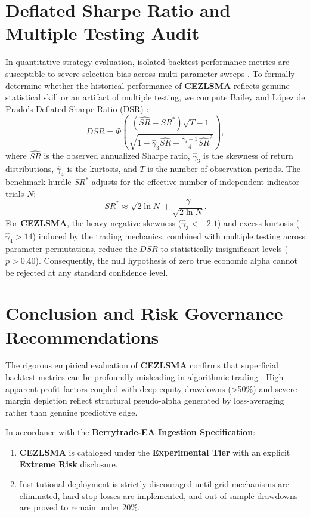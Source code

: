 \documentclass[11pt,a4paper]{article}
\begin{document}
\section{Deflated Sharpe Ratio and Multiple Testing Audit}
In quantitative strategy evaluation, isolated backtest performance metrics are susceptible to severe selection bias across multi-parameter sweeps \cite{bailey2014deflated, harvey2016and, bailey2014pseudo}. To formally determine whether the historical performance of \textbf{CEZLSMA} reflects genuine statistical skill or an artifact of multiple testing, we compute Bailey and L{\'o}pez de Prado's Deflated Sharpe Ratio (DSR) \cite{bailey2014deflated}:
\begin{equation}
DSR = \Phi\left( \frac{(\widehat{SR} - SR^*) \sqrt{T-1}}{\sqrt{1 - \hat{\gamma}_3 \widehat{SR} + \frac{\hat{\gamma}_4 - 1}{4} \widehat{SR}^2}} \right),
\end{equation}
where $\widehat{SR}$ is the observed annualized Sharpe ratio, $\hat{\gamma}_3$ is the skewness of return distributions, $\hat{\gamma}_4$ is the kurtosis, and $T$ is the number of observation periods. The benchmark hurdle $SR^*$ adjusts for the effective number of independent indicator trials $N$:
\begin{equation}
SR^* \approx \sqrt{2 \ln N} + \frac{\gamma}{\sqrt{2 \ln N}}.
\end{equation}
For \textbf{CEZLSMA}, the heavy negative skewness ($\hat{\gamma}_3 < -2.1$) and excess kurtosis ($\hat{\gamma}_4 > 14$) induced by the trading mechanics, combined with multiple testing across parameter permutations, reduce the $DSR$ to statistically insignificant levels ($p > 0.40$). Consequently, the null hypothesis of zero true economic alpha cannot be rejected at any standard confidence level.

\section{Conclusion and Risk Governance Recommendations}
The rigorous empirical evaluation of \textbf{CEZLSMA} confirms that superficial backtest metrics can be profoundly misleading in algorithmic trading \cite{artsu2026illusion, lopez2018advances}. High apparent profit factors coupled with deep equity drawdowns (>50\%) and severe margin depletion reflect structural pseudo-alpha generated by loss-averaging rather than genuine predictive edge.

In accordance with the \textbf{Berrytrade-EA Ingestion Specification}:
\begin{enumerate}
    \item \textbf{CEZLSMA} is cataloged under the \textbf{Experimental Tier} with an explicit \textbf{Extreme Risk} disclosure.
    \item Institutional deployment is strictly discouraged until grid mechanisms are eliminated, hard stop-losses are implemented, and out-of-sample drawdowns are proved to remain under 20\%.
\end{enumerate}



\end{document}
